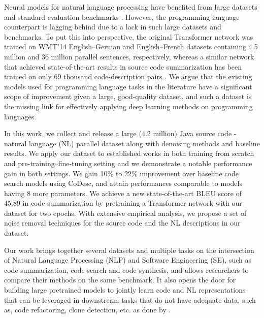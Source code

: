 \documentclass[11pt,a4paper]{article}
\begin{document}
Neural models for natural language processing have benefited from large datasets and standard evaluation benchmarks \cite{glue,superglue,rajpurkar2016squad,hermann2015teaching,common-crawl}. However, the programming language counterpart is lagging behind due to a lack in such large datasets and benchmarks.
To put this into perspective, the original Transformer network \cite{transformer} was trained on WMT'14 English--German and English--French datasets \cite{wmt-14} containing 4.5 million and 36 million parallel sentences, respectively, whereas a similar network that achieved state-of-the-art results in source code summarization has been trained on only 69 thousand code-description pairs \cite{ncs}. We argue that the existing models used for programming language tasks in the literature have a significant scope of improvement given a large, good-quality dataset, and such a dataset is the missing link for effectively applying deep learning methods on programming languages.

In this work, we collect and release a large (4.2 million) Java source code - natural language (NL) parallel dataset along with denoising methods and baseline results.
We apply our dataset to established works in both training from scratch and pre-training--fine-tuning setting and we demonstrate a notable performance gain in both settings. We gain 10\% to 22\% improvement over baseline code search models using CoDesc, and attain performances comparable to models having 8 more parameters. We achieve a new state-of-the-art BLEU score of 45.89 in code summarization by pretraining a Transformer network with our dataset for two epochs. With extensive empirical analysis, we propose a set of noise removal techniques for the source code and the NL descriptions in our dataset.

Our work brings together several datasets and multiple tasks on the intersection of Natural Language Processing (NLP) and Software Engineering (SE), such as code summarization, code search and code synthesis, and allows researchers to compare their methods on the same benchmark. It also opens the door for building large pretrained models to jointly learn code and NL representations that can be leveraged in downstream tasks  that do not have adequate data, such as, code refactoring, clone detection, etc. as done by \citet{codebert}.





 
\end{document}
